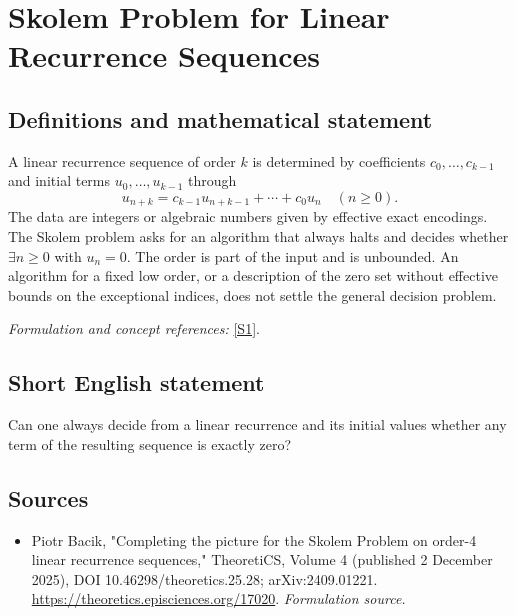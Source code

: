 \documentclass[11pt]{article}
\begin{document}
\section*{\texorpdfstring{Skolem Problem for Linear Recurrence Sequences}{Skolem Problem for Linear Recurrence Sequences}}\label{217}
\subsection{Definitions and mathematical statement}
A linear recurrence sequence of order $k$ is determined by coefficients $c_0,\ldots,c_{k-1}$ and initial terms $u_0,\ldots,u_{k-1}$ through
\[
 u_{n+k}=c_{k-1}u_{n+k-1}+\cdots+c_0u_n\quad(n\ge0).
\]
The data are integers or algebraic numbers given by effective exact encodings. The Skolem problem asks for an algorithm that always halts and decides whether $\exists n\ge0$ with $u_n=0$. The order is part of the input and is unbounded. An algorithm for a fixed low order, or a description of the zero set without effective bounds on the exceptional indices, does not settle the general decision problem.
\par\smallskip\textit{Formulation and concept references:} \href{https://theoretics.episciences.org/17020}{[S1]}.

\subsection{Short English statement}
Can one always decide from a linear recurrence and its initial values whether any term of the resulting sequence is exactly zero?
\subsection{Sources}
\begin{itemize}
\item[S1]Piotr Bacik, "Completing the picture for the Skolem Problem on order-4 linear recurrence sequences," TheoretiCS, Volume 4 (published 2 December 2025), DOI 10.46298/theoretics.25.28; arXiv:2409.01221.
\url{https://theoretics.episciences.org/17020}.
\textit{Formulation source.}
\end{itemize}
\end{document}

